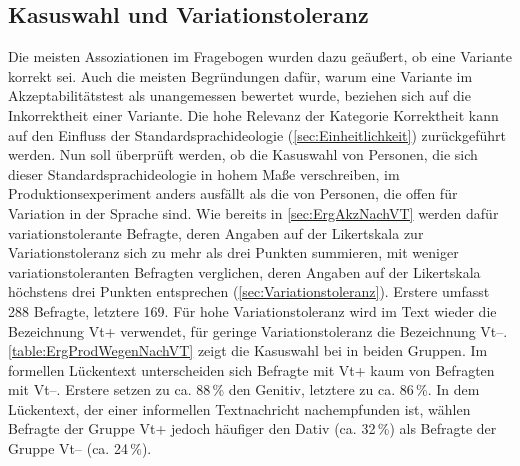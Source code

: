 \subsection{Kasuswahl und Variationstoleranz}
\label{sec:ErgProdNachVT}
Die meisten Assoziationen im Fragebogen wurden dazu geäußert, ob eine Variante korrekt sei.
Auch die meisten Begründungen dafür, warum eine Variante im Akzeptabilitätstest als unangemessen bewertet wurde, beziehen sich auf die Inkorrektheit einer Variante. 
Die hohe Relevanz der Kategorie \glqq Korrektheit\grqq{} kann auf den Einfluss der Standardsprachideologie (\autoref{sec:Einheitlichkeit}) zurückgeführt werden. 
Nun soll überprüft werden, ob die Kasuswahl von Personen, die sich dieser Standardsprachideologie in hohem Maße verschreiben, im Produktionsexperiment anders ausfällt als die von Personen, die offen für Variation in der Sprache sind. 
Wie bereits in \autoref{sec:ErgAkzNachVT} %
werden dafür variationstolerante Befragte, deren Angaben auf der Likertskala zur Variationstoleranz sich zu mehr als drei Punkten summieren, mit weniger variationstoleranten Befragten verglichen, deren Angaben auf der Likertskala höchstens drei Punkten entsprechen (\autoref{sec:Variationstoleranz}). %
Erstere umfasst 288 Befragte, letztere 169. 
Für hohe Variationstoleranz wird im Text wieder die Bezeichnung Vt+ verwendet, für geringe Variationstoleranz die Bezeichnung Vt--. 
 \autoref{table:ErgProdWegenNachVT} zeigt die Kasuswahl bei \wegen{} in beiden Gruppen.
Im formellen Lückentext unterscheiden sich Befragte mit Vt+ kaum von Befragten mit Vt--. 
Erstere setzen zu ca. 88\,\% den Genitiv, letztere zu ca. 86\,\%. 
In dem Lückentext, der einer informellen Textnachricht nachempfunden ist, wählen Befragte der Gruppe Vt+ jedoch häufiger den Dativ (ca. 32\,\%) als Befragte der Gruppe Vt-- (ca. 24\,\%). 

